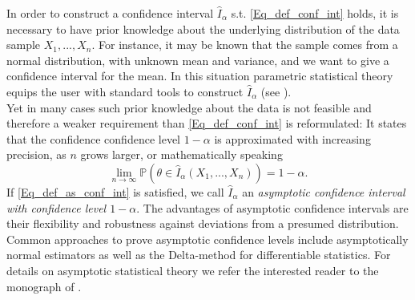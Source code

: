 \documentclass[conference]{IEEEtran}
\begin{document}
In order to construct a confidence interval $\hat I_\alpha$ s.t. \eqref{Eq_def_conf_int} holds, it is necessary to have prior knowledge about the underlying distribution of the data sample $X_1,..., X_n$. For instance, it may be known that the sample comes from a normal distribution, with unknown mean and variance, and we want to give a confidence interval for the mean. In this situation parametric statistical theory equips the user with standard tools to construct $\hat I_\alpha$ (see \cite{bickel2015}).\\ Yet in many cases such prior knowledge about the data is not feasible and therefore a weaker requirement than \eqref{Eq_def_conf_int} is reformulated: It states that the confidence confidence level $1-\alpha$ is approximated with increasing precision, as $n$ grows larger, or mathematically speaking 
\begin{equation} \label{Eq_def_as_conf_int}
\lim_{n \to \infty}\mathbb{P}(\theta   \in \hat I_\alpha(X_1,...,X_n)) = 1-\alpha.
\end{equation}
If \eqref{Eq_def_as_conf_int} is satisfied, we call $\hat I_\alpha$ an \textit{asymptotic confidence interval with confidence level $1-\alpha$}. The advantages of asymptotic confidence intervals are their flexibility and robustness against deviations from a presumed distribution. Common approaches to prove asymptotic confidence levels include asymptotically normal estimators as well as the Delta-method for differentiable statistics. For details on asymptotic statistical theory we refer the interested reader to the monograph of \cite{vandervaart1996}.
\end{document}
